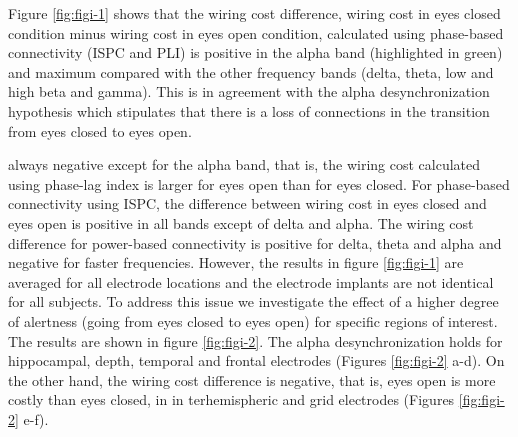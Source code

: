 \documentclass[11pt, onecolumn]{article}
\begin{document}
Figure \ref{fig:figi-1} shows that the wiring cost difference, wiring cost in eyes closed condition minus wiring cost in eyes open condition, calculated using phase-based connectivity (ISPC and PLI) is positive in the alpha band (highlighted in green) and maximum compared with the other frequency bands (delta, theta, low and high beta and gamma). This is in agreement with the alpha desynchronization hypothesis which stipulates that there is a loss of connections in the transition from eyes closed to eyes open.


always negative except for the alpha band, that is, the wiring cost calculated using phase-lag index is larger for eyes open than for eyes closed. 
For phase-based connectivity using ISPC, the difference between wiring cost in eyes closed and eyes open is positive in all bands except of delta and alpha. The wiring cost difference for power-based connectivity is positive for delta, theta and alpha and negative for faster frequencies. 
However, the results in figure \ref{fig:figi-1} are averaged for all electrode locations and the electrode implants are not identical for all subjects. 
To address this issue we investigate the effect of a higher degree of alertness (going from eyes closed to eyes open) for specific regions of interest. The results are shown in figure \ref{fig:figi-2}. 
The alpha desynchronization holds for hippocampal, depth, temporal and frontal electrodes (Figures \ref{fig:figi-2} a-d). On the other hand, the wiring cost difference is negative, that is, eyes open is more costly than eyes closed, in  in terhemispheric and grid electrodes (Figures \ref{fig:figi-2} e-f).

\end{document}
